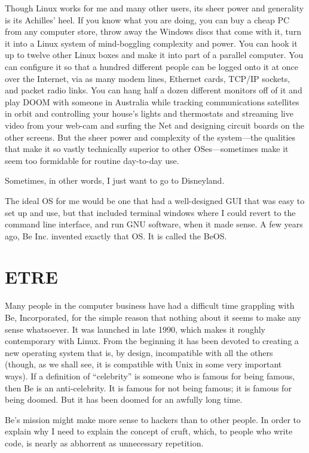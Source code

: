 \documentclass[
  fontsize=11pt,
  paper=landscape,
  twocolumn=true,
  pagesize=pdftex,
  headings=small,
  DIV=15,
  ]{scrartcl}
\begin{document}
Though Linux works for me and many other users, its sheer power and
generality is its Achilles' heel. If you know what you are doing, you
can buy a cheap PC from any computer store, throw away the Windows discs
that come with it, turn it into a Linux system of mind-boggling
complexity and power. You can hook it up to twelve other Linux boxes and
make it into part of a parallel computer. You can configure it so that a
hundred different people can be logged onto it at once over the
Internet, via as many modem lines, Ethernet cards, TCP/IP sockets, and
packet radio links. You can hang half a dozen different monitors off of
it and play DOOM with someone in Australia while tracking communications
satellites in orbit and controlling your house's lights and thermostats
and streaming live video from your web-cam and surfing the Net and
designing circuit boards on the other screens. But the sheer power and
complexity of the system---the qualities that make it so vastly
technically superior to other OSes---sometimes make it seem too
formidable for routine day-to-day use.

Sometimes, in other words, I just want to go to Disneyland.

The ideal OS for me would be one that had a well-designed GUI that was
easy to set up and use, but that included terminal windows where I could
revert to the command line interface, and run GNU software, when it made
sense. A few years ago, Be Inc. invented exactly that OS. It is called
the BeOS.

\section{ETRE}

Many people in the computer business have had a difficult time grappling
with Be, Incorporated, for the simple reason that nothing about it seems
to make any sense whatsoever. It was launched in late 1990, which makes
it roughly contemporary with Linux. From the beginning it has been
devoted to creating a new operating system that is, by design,
incompatible with all the others (though, as we shall see, it is
compatible with Unix in some very important ways). If a definition of
``celebrity'' is someone who is famous for being famous, then Be is an
anti-celebrity. It is famous for not being famous; it is famous for
being doomed. But it has been doomed for an awfully long time.

Be's mission might make more sense to hackers than to other people. In
order to explain why I need to explain the concept of cruft, which, to
people who write code, is nearly as abhorrent as unnecessary repetition.
\end{document}
